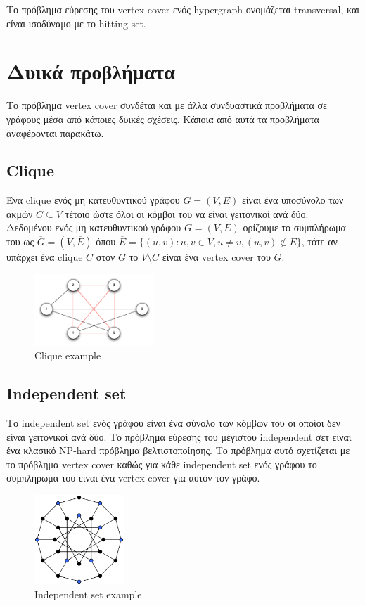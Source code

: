 Το πρόβλημα εύρεσης του vertex cover ενός hypergraph ονομάζεται transversal, και είναι ισοδύναμο με το hitting set.


\section{Δυικά προβλήματα}

Το πρόβλημα vertex cover συνδέται και με άλλα συνδυαστικά προβλήματα σε γράφους μέσα από κάποιες δυικές σχέσεις. Κάποια από αυτά τα προβλήματα αναφέρονται παρακάτω.

\subsection{Clique}
Ένα clique ενός μη κατευθυντικού γράφου $G=(V,E)$ είναι ένα υποσύνολο των ακμών $C \subseteq V$ τέτοιο ώστε όλοι οι κόμβοι του να είναι γειτονικοί ανά δύο.\\
Δεδομένου ενός μη κατευθυντικού γράφου $G=(V,E)$ ορίζουμε το συμπλήρωμα του ως $\overline{G} = (V, \overline{E})$ όπου $\overline{E} = \{(u,v):u,v \in{V}, u \neq v, (u,v) \notin{E}\}$, τότε αν υπάρχει ένα clique $C$ στον $\overline{G}$ το $V \setminus C$ είναι ένα vertex cover του $G$.

\begin{figure}[H]
\caption{Clique example}
\centering
\includegraphics[width=0.4\textwidth]{Figures/VertexClique.png}\centering
\end{figure}

\subsection{Independent set}
Το independent set ενός γράφου είναι ένα σύνολο των κόμβων του οι οποίοι δεν είναι γειτονικοί ανά δύο. Το πρόβλημα εύρεσης του μέγιστου independent σετ είναι ένα κλασικό NP-hard πρόβλημα βελτιστοποίησης. Το πρόβλημα αυτό σχετίζεται με το πρόβλημα vertex cover καθώς για κάθε independent set ενός γράφου το συμπλήρωμα του είναι ένα vertex cover για αυτόν τον γράφο.	

\begin{figure}[H]
\caption{Independent set example}
\centering
\includegraphics[width=0.3\textwidth]{Figures/indep_set.png}\centering
\end{figure}
